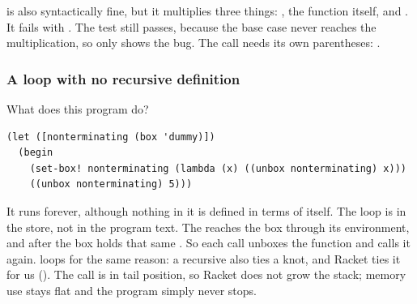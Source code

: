 \begin{pitfall}
 is also syntactically fine, but it multiplies three things: , the function itself, and . It fails with . The test  still passes, because the base case never reaches the multiplication, so only  shows the bug. The call needs its own parentheses: .
\end{pitfall}

\subsubsection{A loop with no recursive definition} What does this program do?
\begin{lstlisting}
(let ([nonterminating (box 'dummy)])
  (begin
    (set-box! nonterminating (lambda (x) ((unbox nonterminating) x)))
    ((unbox nonterminating) 5)))
\end{lstlisting}
It runs forever, although nothing in it is defined in terms of itself. The loop is in the store, not in the program text. The  reaches the box through its environment, and after  the box holds that same . So each call unboxes the function and calls it again.  loops for the same reason: a recursive  also ties a knot, and Racket ties it for us (). The call is in tail position, so Racket does not grow the stack; memory use stays flat and the program simply never stops.

